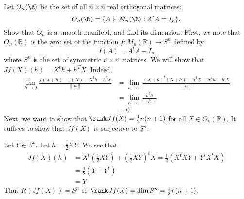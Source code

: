 \documentclass{../../../tex-setup/eh-homework}
\begin{document}
    \begin{question}{40}
        Let $O_n(\R)$ be the set of all $n\times n$ real orthogonal matrices:
        \[ O_n(\R) = \{A\in M_n(\R) : A^tA=I_n\}. \]
        Show that $O_n$ is a smooth manifold, and find its dimension.
        \tcblower
        First, we note that \(O_n(\mathbb{R})\) is the zero set of the function \(f: M_n(\mathbb{R}) \to S^n\) defined by
        \[
            f(A) = A^t A - I_n
        \]
        where \(S^n\) is the set of symmetric \(n\times n\) matrices. We will show that \(Jf(X)(h) = X^t h + h^T X\). Indeed,
        \begin{align*}
            \lim_{h \to 0} \frac{f(X + h) - f(X) - X^t h - h^t X}{\|h\|} &= \lim_{h \to 0} \frac{(X + h)^t (X + h) - X^t X - X^t h - h^t X}{\|h\|} \\
            &= \lim_{h \to 0} \frac{h^t h}{\|h\|} \\
            &= 0
        \end{align*}
        Next, we want to show that \(\rank Jf(X) = \frac{1}{2}n(n+1)\) for all \(X \in O_n(\mathbb{R})\). It suffices to show that \(Jf(X)\) is surjective to \(S^n\).

        Let \(Y \in S^n\). Let \(h = \frac{1}{2}XY\). We see that
        \begin{align*}
            Jf(X)(h) &= X^t \left( \frac{1}{2}XY \right) + \left( \frac{1}{2}XY \right)^t X = \frac{1}{2}\left( X^t XY + Y^t X^t X \right) \\
            &= \frac{1}{2}(Y + Y^t) \tag{\(X\) is orthogonal} \\
            &= Y \tag{\(Y\) is symmetric}
        \end{align*}
        Thus \(R(Jf(X)) = S^n\) so \(\rank Jf(X) = \dim S^n = \frac{1}{2}n(n+1)\).
    \end{question}
\end{document}
